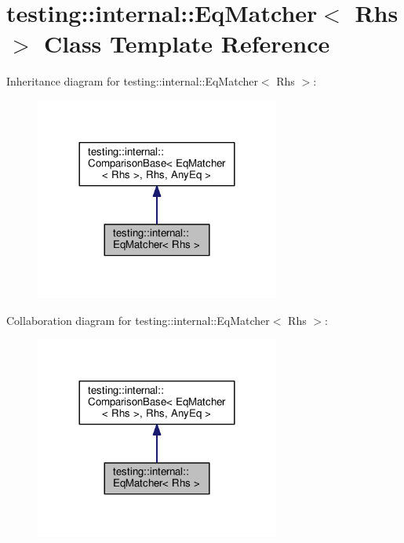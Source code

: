 \hypertarget{classtesting_1_1internal_1_1EqMatcher}{}\section{testing\+:\+:internal\+:\+:Eq\+Matcher$<$ Rhs $>$ Class Template Reference}
\label{classtesting_1_1internal_1_1EqMatcher}


Inheritance diagram for testing\+:\+:internal\+:\+:Eq\+Matcher$<$ Rhs $>$\+:\nopagebreak
\begin{figure}[H]
\begin{center}
\leavevmode
\includegraphics[width=228pt]{classtesting_1_1internal_1_1EqMatcher__inherit__graph}
\end{center}
\end{figure}


Collaboration diagram for testing\+:\+:internal\+:\+:Eq\+Matcher$<$ Rhs $>$\+:\nopagebreak
\begin{figure}[H]
\begin{center}
\leavevmode
\includegraphics[width=228pt]{classtesting_1_1internal_1_1EqMatcher__coll__graph}
\end{center}
\end{figure}
